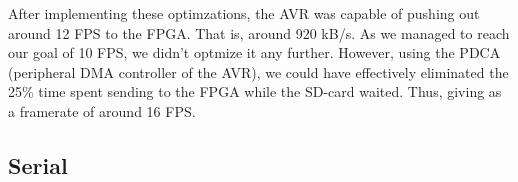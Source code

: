 After implementing these optimzations, the AVR was capable of pushing out around 12 FPS to the FPGA. That is, around 920 kB/s. As we managed to reach our goal of 10 FPS, we didn't optmize it any further. However, using the PDCA (peripheral DMA controller of the AVR), we could have effectively eliminated the 25\% time spent sending to the FPGA while the SD-card waited. Thus, giving as a framerate of around 16 FPS.

\subsection{Serial}


